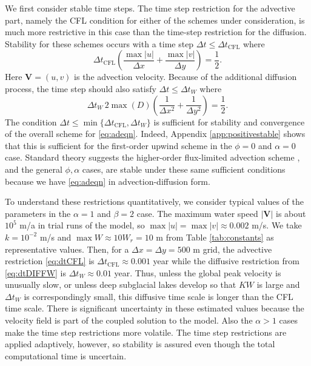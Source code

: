 \documentclass[11pt,final]{amsart}
\newcommand\bV{\mathbf{V}}
\begin{document}
We first consider stable time steps.  The time step restriction for the advective part, namely the CFL condition for either of the schemes under consideration, is much more restrictive in this case than the time-step restriction for the diffusion.  Stability for these schemes occurs with a time step $\Delta t \le \Delta t_{\text{CFL}}$ where
\begin{equation}
\Delta t_{\text{CFL}} \left(\frac{\max |u|}{\Delta x} + \frac{\max |v|}{\Delta y}\right) = \frac{1}{2}. \label{eq:dtCFL}
\end{equation}
Here $\bV=(u,v)$ is the advection velocity.  Because of the additional diffusion process, the time step should also satisfy $\Delta t \le \Delta t_{W}$  where \citep{MortonMayers}
\begin{equation}
\Delta t_W\, 2 \max(D) \left(\frac{1}{\Delta x^2} + \frac{1}{\Delta y^2}\right) = \frac{1}{2}. \label{eq:dtDIFFW}
\end{equation}
The condition $\Delta t \le \min\{\Delta t_{\text{CFL}}, \Delta t_W\}$ is sufficient for stability and convergence of the overall scheme for \eqref{eq:adeqn}.  Indeed, Appendix \ref{app:positivestable} shows that this is sufficient for the first-order upwind scheme in the $\phi=0$ and $\alpha = 0$ case.  Standard theory suggests the higher-order flux-limited advection scheme \citep{HundsdorferVerwer2010}, and the general $\phi,\alpha$ cases, are stable under these same sufficient conditions because we have \eqref{eq:adeqn} in advection-diffusion form.

To understand these restrictions quantitatively, we consider typical values of the parameters in the $\alpha=1$ and $\beta=2$ case.  The maximum water speed $|\bV|$ is about $10^5$ m/a in trial runs of the model, so $\max |u| = \max |v| \approx 0.002$ m/s.  We take $k=10^{-2}$ m/s and $\max W\approx 10 W_r=10$ m  from Table \ref{tab:constants} as representative values.  Then, for a $\Delta x = \Delta y = 500$ m grid, the advective restriction \eqref{eq:dtCFL} is $\Delta t_{\text{CFL}} \approx 0.001$ year while the diffusive restriction from \eqref{eq:dtDIFFW} is $\Delta t_W \approx 0.01$ year.  Thus, unless the global peak velocity is unusually slow, or unless deep subglacial lakes develop so that $K W$ is large and $\Delta t_W$ is correspondingly small, this diffusive time scale is longer than the CFL time scale.  There is significant uncertainty in these estimated values because the velocity field is part of the coupled solution to the model.  Also the $\alpha > 1$ cases make the time step restrictions more volatile.  The time step restrictions are applied adaptively, however, so stability is assured even though the total computational time is uncertain.
\end{document}

